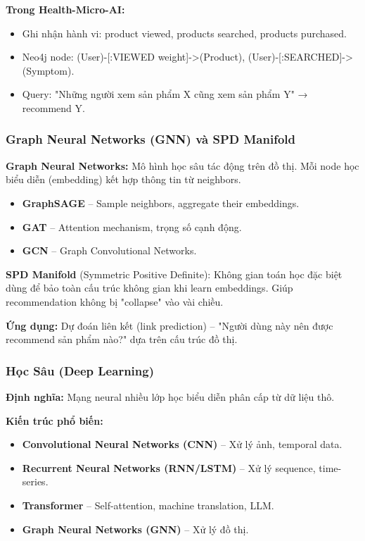 \documentclass[12pt,a4paper]{article}
\begin{document}
\textbf{Trong Health-Micro-AI:}
\begin{itemize}
    \item Ghi nhận hành vi: product viewed, products searched, products purchased.
    \item Neo4j node: (User)-[:VIEWED {weight}]->(Product), (User)-[:SEARCHED]->(Symptom).
    \item Query: "Những người xem sản phẩm X cũng xem sản phẩm Y" → recommend Y.
\end{itemize}

\subsubsection{Graph Neural Networks (GNN) và SPD Manifold}

\textbf{Graph Neural Networks:} Mô hình học sâu tác động trên đồ thị. Mỗi node học biểu diễn (embedding) kết hợp thông tin từ neighbors.

\begin{itemize}
    \item \textbf{GraphSAGE} – Sample neighbors, aggregate their embeddings.
    \item \textbf{GAT} – Attention mechanism, trọng số cạnh động.
    \item \textbf{GCN} – Graph Convolutional Networks.
\end{itemize}

\textbf{SPD Manifold} (Symmetric Positive Definite): Không gian toán học đặc biệt dùng để bảo toàn cấu trúc không gian khi learn embeddings. Giúp recommendation không bị "collapse" vào vài chiều.

\textbf{Ứng dụng:} Dự đoán liên kết (link prediction) – "Người dùng này nên được recommend sản phẩm nào?" dựa trên cấu trúc đồ thị.

\subsubsection{Học Sâu (Deep Learning)}

\textbf{Định nghĩa:} Mạng neural nhiều lớp học biểu diễn phân cấp từ dữ liệu thô.

\textbf{Kiến trúc phổ biến:}
\begin{itemize}
    \item \textbf{Convolutional Neural Networks (CNN)} – Xử lý ảnh, temporal data.
    \item \textbf{Recurrent Neural Networks (RNN/LSTM)} – Xử lý sequence, time-series.
    \item \textbf{Transformer} – Self-attention, machine translation, LLM.
    \item \textbf{Graph Neural Networks (GNN)} – Xử lý đồ thị.
\end{itemize}
\end{document}
